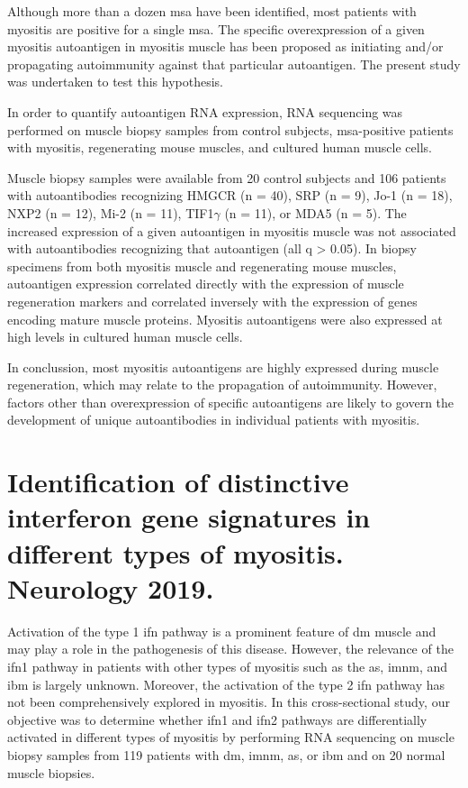 Although more than a dozen \gls{msa} have been identified, most patients with myositis are positive for a single \gls{msa}. The specific overexpression of a given myositis autoantigen in myositis muscle has been proposed as initiating and/or propagating autoimmunity against that particular autoantigen. The present study was undertaken to test this hypothesis.

In order to quantify autoantigen RNA expression, RNA sequencing was performed on muscle biopsy samples from control subjects, \gls{msa}-positive patients with myositis, regenerating mouse muscles, and cultured human muscle cells.

Muscle biopsy samples were available from 20 control subjects and 106 patients with autoantibodies recognizing HMGCR (n = 40), SRP (n = 9), Jo-1 (n = 18), NXP2 (n = 12), Mi-2 (n = 11), TIF1$\gamma$ (n = 11), or MDA5 (n = 5). The increased expression of a given autoantigen in myositis muscle was not associated with autoantibodies recognizing that autoantigen (all q > 0.05). In biopsy specimens from both myositis muscle and regenerating mouse muscles, autoantigen expression correlated directly with the expression of muscle regeneration markers and correlated inversely with the expression of genes encoding mature muscle proteins. Myositis autoantigens were also expressed at high levels in cultured human muscle cells.

In conclussion, most myositis autoantigens are highly expressed during muscle regeneration, which may relate to the propagation of autoimmunity. However, factors other than overexpression of specific autoantigens are likely to govern the development of unique autoantibodies in individual patients with myositis.



\section{Identification of distinctive interferon gene signatures in different types of myositis. Neurology 2019.}
\label{sec:ifn}

Activation of the type 1 \gls{ifn} pathway is a prominent feature of \gls{dm} muscle and may play a role in the pathogenesis of this disease. However, the relevance of the \gls{ifn}1 pathway in patients with other types of myositis such as the \gls{as}, \gls{imnm}, and \gls{ibm} is largely unknown. Moreover, the activation of the type 2 \gls{ifn} pathway has not been comprehensively explored in myositis. In this cross-sectional study, our objective was to determine whether \gls{ifn}1 and \gls{ifn}2 pathways are differentially activated in different types of myositis by performing RNA sequencing on muscle biopsy samples from 119 patients with \gls{dm}, \gls{imnm}, \gls{as}, or \gls{ibm} and on 20 normal muscle biopsies.


